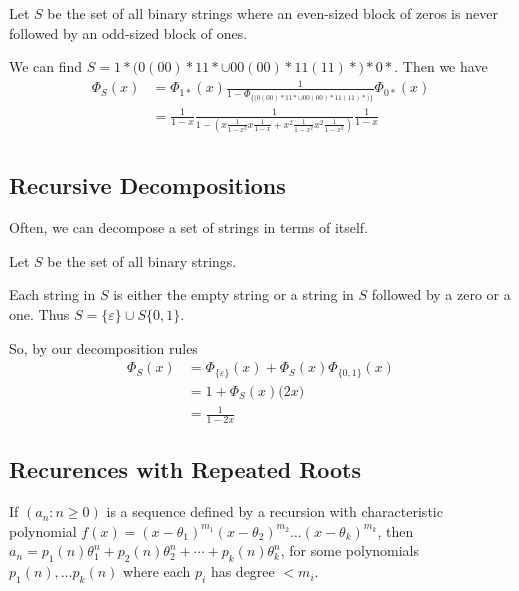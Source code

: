 \documentclass[12pt]{article}
\begin{document}
\begin{example}
Let $S$ be the set of all binary strings where an even-sized block of zeros is never followed by an odd-sized block of ones.

We can find $S = 1*\bigl(0(00)*11* \cup 00(00)*11(11)*\bigl)*0*$. Then we have
\begin{align*}
\Phi_S(x) &= \Phi_{1*}(x) \frac{1}{1 - \Phi_{\{\bigl(0(00)*11* \cup 00(00)*11(11)*\bigl)\}}} \Phi_{0*}(x)\\
&= \frac{1}{1-x} \frac{1}{1-(x\frac{1}{1-x^2} x\frac{1}{1-x} + x^2\frac{1}{1-x^2} x^2\frac{1}{1-x^2})} \frac{1}{1-x}\\
\end{align*}
\end{example}

\subsection{Recursive Decompositions}
Often, we can decompose a set of strings in terms of itself.

\begin{example}
Let $S$ be the set of all binary strings.

Each string in $S$ is either the empty string or a string in $S$ followed by a zero or a one. Thus $S = \{\varepsilon\} \cup S\{0,1\}$.

So, by our decomposition rules
\begin{align*}
\Phi_S(x) &= \Phi_{\{\varepsilon\}}(x) + \Phi_S(x)\Phi_{\{0,1\}}(x)\\
&= 1 + \Phi_S(x)\bigl(2x\bigl)\\
&= \frac{1}{1-2x}
\end{align*}
\end{example}


\subsection{Recurences with Repeated Roots}
\begin{theorem}
If $(a_n: n \geq 0)$ is a sequence defined by a recursion with characteristic polynomial $f(x) = {(x-\theta_1)}^{m_1} {(x-\theta_2)}^{m_2} \dots {(x-\theta_k)}^{m_k}$, then $a_n = p_1(n)\theta_1^n + p_2(n) \theta_2^n + \cdots + p_k(n) \theta_k^n$, for some polynomials $p_1(n), \dots p_k(n)$ where each $p_i$ has degree $< m_i$.
\end{theorem}
\end{document}

